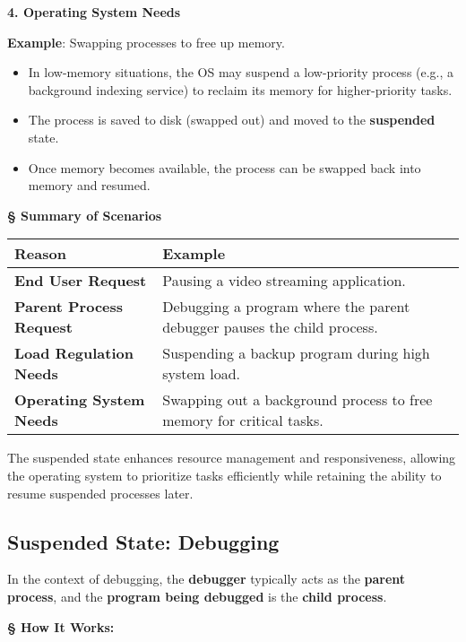 \documentclass[a4paper]{book}
\newcommand{\sfbf}[1]{{\normalsize\textsf{\textbf{§ #1}}}}
\begin{document}
\hrulefill

\textbf{4. Operating System Needs}

\textbf{Example}: Swapping processes to free up memory.
\begin{itemize}
\item 
In low-memory situations, the OS may suspend a low-priority process (e.g., a background indexing service) to reclaim its memory for higher-priority tasks.

\item 
The process is saved to disk (swapped out) and moved to the \textbf{suspended} state.

\item 
Once memory becomes available, the process can be swapped back into memory and resumed.

\end{itemize}

\hrulefill

\sfbf{Summary of Scenarios}

\begin{tabular}{l|p{8cm}}
\hline
\textbf{Reason} & \textbf{Example} \\
\hline
\textbf{End User Request} & Pausing a video streaming application. \\
\hline
\textbf{Parent Process Request} & Debugging a program where the parent debugger pauses the child process. \\
\hline
\textbf{Load Regulation Needs} & Suspending a backup program during high system load. \\
\hline
\textbf{Operating System Needs} & Swapping out a background process to free memory for critical tasks. \\
\hline
\end{tabular}

The suspended state enhances resource management and responsiveness, allowing the operating system to prioritize tasks efficiently while retaining the ability to resume suspended processes later.

\subsection{Suspended State: Debugging}

In the context of debugging, the \textbf{debugger} typically acts as the \textbf{parent process}, and the \textbf{program being debugged} is the \textbf{child process}.

\sfbf{How It Works:}
\end{document}
